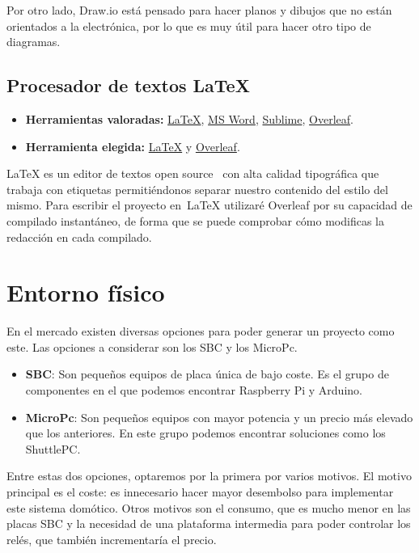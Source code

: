 Por otro lado, Draw.io está pensado para hacer planos y dibujos que no están orientados a la electrónica, por lo que es muy útil para hacer otro tipo de diagramas.

\subsection{Procesador de textos \LaTeX}\label{4:latex}
\begin{itemize}
    \item \textbf{Herramientas valoradas:} \href{https://www.latex-project.org/}{\LaTeX}, \href{https://www.microsoft.com/es-es/microsoft-365/word}{MS Word}, \href{https://www.sublimetext.com/}{Sublime}, \href{https://www.overleaf.com/}{Overleaf}.
    \item \textbf{Herramienta elegida:} \href{https://www.latex-project.org/}{\LaTeX} y \href{https://www.overleaf.com/}{Overleaf}.
\end{itemize}
\LaTeX{} es un editor de textos open source~\cite{misc:OpenSource} con alta calidad tipográfica que trabaja con etiquetas permitiéndonos separar nuestro contenido del estilo del mismo. Para escribir el proyecto en~\LaTeX{} utilizaré Overleaf por su capacidad de compilado instantáneo, de forma que se puede comprobar cómo modificas la redacción en cada compilado.

\section{Entorno físico}

En el mercado existen diversas opciones para poder generar un proyecto como este. Las opciones a considerar son los SBC y los MicroPc.
\begin{itemize}
    \item \textbf{SBC}: Son pequeños equipos de placa única de bajo coste. Es el grupo de componentes en el que podemos encontrar Raspberry Pi y Arduino.
    \item \textbf{MicroPc}: Son pequeños equipos con mayor potencia y un precio más elevado que los anteriores. En este grupo podemos encontrar soluciones como los ShuttlePC.
\end{itemize}

Entre estas dos opciones, optaremos por la primera por varios motivos. El motivo principal es el coste: es innecesario hacer mayor desembolso para implementar este sistema domótico. Otros motivos son el consumo, que es mucho menor en las placas SBC y la necesidad de una plataforma intermedia para poder controlar los relés, que también incrementaría el precio.


